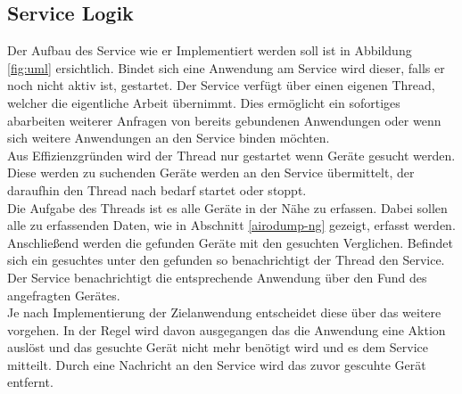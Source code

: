 \documentclass[]{report}
\begin{document}
\subsection{Service Logik}
Der Aufbau des Service wie er Implementiert werden soll ist in Abbildung \ref{fig:uml} ersichtlich. Bindet sich eine Anwendung am Service wird dieser, falls er noch nicht aktiv ist, gestartet. Der Service verfügt über einen eigenen Thread, welcher die eigentliche Arbeit übernimmt. Dies ermöglicht ein sofortiges abarbeiten weiterer Anfragen von bereits gebundenen Anwendungen oder wenn sich weitere Anwendungen an den Service binden möchten. \\
Aus Effizienzgründen wird der Thread nur gestartet wenn Geräte gesucht werden. Diese werden zu suchenden Geräte werden an den Service übermittelt, der daraufhin den Thread nach bedarf startet oder stoppt. \\
Die Aufgabe des Threads ist es alle Geräte in der Nähe zu erfassen. Dabei sollen alle zu erfassenden Daten, wie in Abschnitt \ref{airodump-ng} gezeigt, erfasst werden. Anschließend werden die gefunden Geräte mit den gesuchten Verglichen. Befindet sich ein gesuchtes unter den gefunden so benachrichtigt der Thread den Service. Der Service benachrichtigt die entsprechende Anwendung über den Fund des angefragten Gerätes. \\ 
Je nach Implementierung der Zielanwendung entscheidet diese über das weitere vorgehen. In der Regel wird davon ausgegangen das die Anwendung eine Aktion auslöst und das gesuchte Gerät nicht mehr benötigt wird und es dem Service mitteilt.  
Durch eine Nachricht an den Service wird das zuvor gescuhte Gerät entfernt.\\
\end{document}
